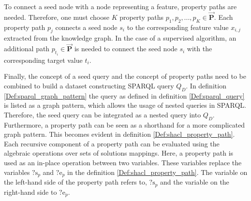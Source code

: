     To connect a seed node with a node representing a feature, property paths are needed. Therefore, one must choose $K$ property paths $p_1,p_2,...,p_K \in \overrightarrow{\mathbf{P}}$. Each property path $p_j$ connects a seed node $s_i$ to the corresponding feature value $x_{i,j}$ extracted from the knowledge graph. In the case of a supervised algorithm, an additional path $p_{t_i} \in \overrightarrow{\mathbf{P}}$ is needed to connect the seed node $s_i$ with the corresponding target value $t_i$.
    
    Finally, the concept of a seed query and the concept of property paths need to be combined to build a dataset constructing SPARQL query $Q_D$. In definition \ref{Def:sparql_graph_pattern} the  query as defined in definition \ref{Def:sparql_query} is listed as a graph pattern, which allows the usage of nested queries in SPARQL. Therefore, the seed query can be integrated as a nested query into $Q_D$. Furthermore, a property path can be seen as a shorthand for a more complicated graph pattern. This becomes evident in definition \ref{Def:shacl_property_path}. Each recursive component of a property path can be evaluated using the algebraic operations over sets of solutions mappings. 
    Here, a property path is used as an in-place operation between two variables. These variables replace the variables $\text{?s}_p$ and $\text{?e}_p$ in the definition \ref{Def:shacl_property_path}. The variable on the left-hand side of the property path refers to, $\text{?s}_p$ and the variable on the right-hand side to $\text{?e}_p$.
    
